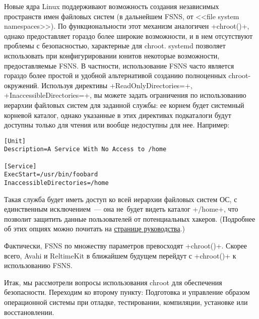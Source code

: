 \documentclass[10pt,oneside,a4paper]{article}
\begin{document}
Новые ядра Linux поддерживают возможность создания независимых пространств имен
файловых систем (в дальнейшем FSNS, от <<file system namespaces>>). По
функциональности этот механизм аналогичен +chroot()+, однако предоставляет
гораздо более широкие возможности, и в нем отсутствуют проблемы с безопасностью,
характерные для chroot. systemd позволяет использовать при конфигурировании
юнитов некоторые возможности, предоставляемые FSNS. В частности, использование
FSNS часто является гораздо более простой и удобной альтернативой созданию
полноценных chroot-окружений. Используя директивы +ReadOnlyDirectories=+,
+InaccessibleDirectories=+, вы можете задать ограничения по использованию
иерархии файловых систем для заданной службы: ее корнем будет системный корневой
каталог, однако указанные в этих директивах подкаталоги будут доступны только 
для чтения или вообще недоступны для нее. Например:
\begin{Verbatim}
[Unit]
Description=A Service With No Access to /home

[Service]
ExecStart=/usr/bin/foobard
InaccessibleDirectories=/home
\end{Verbatim}

Такая служба будет иметь доступ ко всей иерархии файловых систем ОС, с
единственным исключением~--- она не~будет видеть каталог +/home+, что позволит
защитить данные пользователей от потенциальных хакеров. (Подробнее об этих
опциях можно почитать на
\href{http://0pointer.de/public/systemd-man/systemd.exec.html}{странице
руководства}.)

Фактически, FSNS по множеству параметров превосходят +chroot()+. Скорее всего,
Avahi и ReltimeKit в ближайшем будущем перейдут с +chroot()+ к использованию
FSNS.

Итак, мы рассмотрели вопросы использования chroot для обеспечения безопасности.
Переходим ко второму пункту: Подготовка и управление образом операционной
системы при отладке, тестировании, компиляции, установке или восстановлении.
\end{document}
